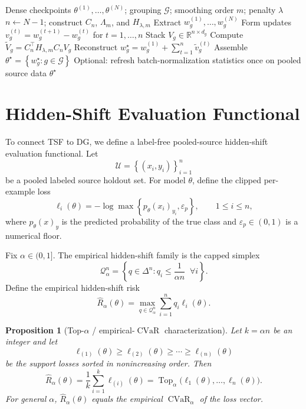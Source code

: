 \documentclass{article}
\newtheorem{proposition}{Proposition}
\newcommand{\RR}{\mathbb{R}}
\newcommand{\cG}{\mathcal{G}}
\newcommand{\cQ}{\mathcal{Q}}
\newcommand{\cU}{\mathcal{U}}
\newcommand{\Top}{\operatorname{Top}}
\newcommand{\CVaR}{\operatorname{CVaR}}
\newcommand{\simplex}{\Delta}
\newcommand{\tsf}{\textup{\textsc{TSF}}}
\newcommand{\braces}[1]{\left\{ #1 \right\}}
\newcommand{\loss}{\ell}
\begin{document}
\begin{algorithm}[t]
\caption{\tsf{}}
\label{alg:tsf}
\begin{algorithmic}[1]
\Require Dense checkpoints \(\theta^{(1)},\ldots,\theta^{(N)}\); grouping \(\cG\); smoothing order \(m\); penalty \(\lambda\)
\State \(n \gets N-1\); construct \(C_n\), \(\Lambda_m\), and \(H_{\lambda,m}\)
\For{each group \(g\in\cG\)}
    \State Extract \(w_g^{(1)},\ldots,w_g^{(N)}\)
    \State Form updates \(v_g^{(t)} = w_g^{(t+1)} - w_g^{(t)}\) for \(t=1,\ldots,n\)
    \State Stack \(V_g \in \RR^{n\times d_g}\)
    \State Compute \(\widetilde V_g = C_n^\top H_{\lambda,m} C_n V_g\)
    \State Reconstruct \(w_g^\star = w_g^{(1)} + \sum_{t=1}^{n} \widetilde v_g^{(t)}\)
\EndFor
\State Assemble \(\theta^\star = \braces{w_g^\star : g\in\cG}\)
\State Optional: refresh batch-normalization statistics once on pooled source data
\State \Return \(\theta^\star\)
\end{algorithmic}
\end{algorithm}

\section{Hidden-Shift Evaluation Functional}
\label{sec:hidden_shift}

To connect \tsf{} to DG, we define a label-free pooled-source hidden-shift evaluation functional. Let
\[
\cU = \braces{(x_i,y_i)}_{i=1}^n
\]
be a pooled labeled source holdout set. For model \(\theta\), define the clipped per-example loss
\begin{equation}
\loss_i(\theta)
=
-\log \max\braces{ p_\theta(x_i)_{y_i}, \varepsilon_p },
\qquad
1\le i\le n,
\label{eq:clipped_loss}
\end{equation}
where \(p_\theta(x)_y\) is the predicted probability of the true class and \(\varepsilon_p\in(0,1)\) is a numerical floor.

Fix \(\alpha \in (0,1]\). The empirical hidden-shift family is the capped simplex
\begin{equation}
\cQ_\alpha^n
=
\braces{
q\in \simplex^n :
q_i \le \frac{1}{\alpha n}
\;\; \forall i }.
\label{eq:capped_simplex}
\end{equation}
Define the empirical hidden-shift risk
\begin{equation}
\widehat R_\alpha(\theta)
=
\max_{q\in\cQ_\alpha^n} \sum_{i=1}^{n} q_i \loss_i(\theta).
\label{eq:hidden_shift_risk}
\end{equation}

\begin{proposition}[Top-\(\alpha\) / empirical-\(\CVaR\) characterization]
\label{prop:topalpha}
Let \(k = \alpha n\) be an integer and let
\[
\loss_{(1)}(\theta)\ge \loss_{(2)}(\theta)\ge \cdots \ge \loss_{(n)}(\theta)
\]
be the support losses sorted in nonincreasing order. Then
\begin{equation}
\widehat R_\alpha(\theta)
=
\frac{1}{k}\sum_{i=1}^{k} \loss_{(i)}(\theta)
=
\Top_\alpha\!\big(\loss_1(\theta),\ldots,\loss_n(\theta)\big).
\label{eq:topalpha}
\end{equation}
For general \(\alpha\), \(\widehat R_\alpha(\theta)\) equals the empirical \(\CVaR_\alpha\) of the loss vector.
\end{proposition}
\end{document}
